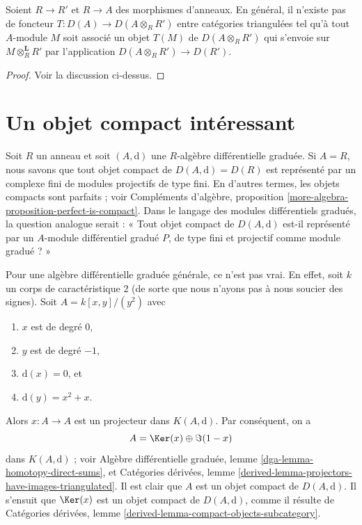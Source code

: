 \begin{lemma}
\label{lemma-no-derived-base-change}
Soient $R \to R'$ et $R \to A$ des morphismes d'anneaux. En général, il
n'existe pas de foncteur $T : D(A) \to D(A \otimes_R R')$
entre catégories triangulées tel qu'à tout $A$-module $M$ soit associé un
objet $T(M)$ de $D(A \otimes_R R')$ qui s'envoie sur
$M \otimes_R^\mathbf{L} R'$ par l'application $D(A \otimes_R R') \to D(R')$.
\end{lemma}

\begin{proof}
Voir la discussion ci-dessus.
\end{proof}




\section{Un objet compact intéressant}
\label{section-interesting-compact}


\noindent
Soit $R$ un anneau et soit $(A, \text{d})$ une $R$-algèbre différentielle graduée.
Si $A = R$, nous savons que tout objet compact de $D(A, \text{d}) = D(R)$
est représenté par un complexe fini de modules projectifs de type fini. En
d'autres termes, les objets compacts sont parfaits ; voir
Compléments d'algèbre, proposition \ref{more-algebra-proposition-perfect-is-compact}.
Dans le langage des modules différentiels gradués, la question analogue
serait : « Tout objet compact de $D(A, \text{d})$ est-il représenté
par un $A$-module différentiel gradué $P$, de type fini et
projectif comme module gradué ? »

\medskip\noindent
Pour une algèbre différentielle graduée générale, ce n'est pas vrai. En effet,
soit $k$ un corps de caractéristique $2$
(de sorte que nous n'ayons pas à nous soucier des signes).
Soit $A = k[x, y]/(y^2)$
avec
\begin{enumerate}
\item $x$ est de degré $0$,
\item $y$ est de degré $-1$,
\item $\text{d}(x) = 0$, et
\item $\text{d}(y) = x^2 + x$.
\end{enumerate}
Alors $x : A \to A$ est un projecteur dans $K(A, \text{d})$.
Par conséquent, on a
$$
A = \Ker(x) \oplus \Im(1 - x)
$$
dans $K(A, \text{d})$ ; voir
Algèbre différentielle graduée, lemme \ref{dga-lemma-homotopy-direct-sums}, et
Catégories dérivées, lemme
\ref{derived-lemma-projectors-have-images-triangulated}.
Il est clair que $A$ est un objet compact de $D(A, \text{d})$.
Il s'ensuit que $\Ker(x)$ est un objet compact de $D(A, \text{d})$,
comme il résulte de
Catégories dérivées, lemme \ref{derived-lemma-compact-objects-subcategory}.

